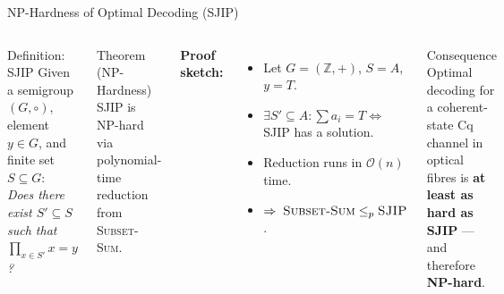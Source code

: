 \documentclass[aspectratio=169,10pt]{beamer}
\newcommand{\Z}{\mathbb{Z}}
\begin{document}
\begin{frame}{NP-Hardness of Optimal Decoding (SJIP)}
  \begin{columns}[T]
      \begin{block}{Definition: SJIP}
        Given a semigroup $(G,\circ)$, element $y\in G$, and finite set
        $S\subseteq G$:\\[4pt]
        \emph{Does there exist $S'\subseteq S$ such that
        $\prod_{x\in S'}x=y$?}
      \end{block}
      \medskip
      \begin{alertblock}{Theorem (NP-Hardness)}
        SJIP is NP-hard via polynomial-time reduction from
        \textsc{Subset-Sum}.
      \end{alertblock}
      \medskip
      \textbf{Proof sketch:}
      \begin{itemize}
        \item Let $G=(\Z,+)$, $S=A$, $y=T$.
        \item $\exists S'\subseteq A:\sum a_i=T\iff$ SJIP has a solution.
        \item Reduction runs in $\mathcal{O}(n)$ time.
        \item $\Rightarrow\;\textsc{Subset-Sum}\le_p\textsc{SJIP}$.
      \end{itemize}

      \begin{exampleblock}{Consequence}
        Optimal decoding for a coherent-state Cq channel in optical
        fibres is \textbf{at least as hard as SJIP} — and therefore
        \textbf{NP-hard}.
      \end{exampleblock}
      \bigskip

  \end{columns}
\end{frame}
\end{document}
